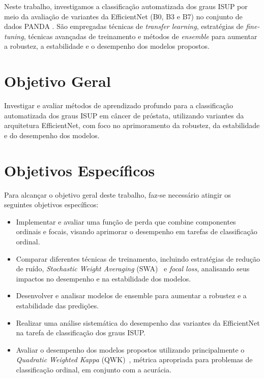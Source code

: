 Neste trabalho, investigamos a classificação automatizada dos graus ISUP por meio da avaliação de variantes da EfficientNet (B0, B3 e B7) no conjunto de dados PANDA \cite{ref-panda2020}. São empregadas técnicas de \textit{transfer learning}, estratégias de \textit{fine-tuning}, técnicas avançadas de treinamento e métodos de \textit{ensemble} para aumentar a robustez, a estabilidade e o desempenho dos modelos propostos.

\section{Objetivo Geral}
\label{sec:objetivo-geral}

Investigar e avaliar métodos de aprendizado profundo para a classificação automatizada dos graus ISUP em câncer de próstata, utilizando variantes da arquitetura EfficientNet, com foco no aprimoramento da robustez, da estabilidade e do desempenho dos modelos.

\section{Objetivos Específicos}
\label{sec:objetivos-especificos}

Para alcançar o objetivo geral deste trabalho, faz-se necessário atingir os seguintes objetivos específicos:

\begin{itemize}
    \item Implementar e avaliar uma função de perda que combine componentes ordinais e focais, visando aprimorar o desempenho em tarefas de classificação ordinal.
    \item  Comparar diferentes técnicas de treinamento, incluindo estratégias de redução de ruído, \textit{Stochastic Weight Averaging} (SWA)~\cite{ref-izmailov2018} e \textit{focal loss}, analisando seus impactos no desempenho e na estabilidade dos modelos.
    \item Desenvolver e analisar modelos de ensemble para aumentar a robustez e a estabilidade das predições.
    \item Realizar uma análise sistemática do desempenho das variantes da EfficientNet na tarefa de classificação dos graus ISUP.
    \item Avaliar o desempenho dos modelos propostos utilizando principalmente o \textit{Quadratic Weighted Kappa} (QWK)~\cite{ref-cohen1968}, métrica apropriada para problemas de classificação ordinal, em conjunto com a acurácia.
\end{itemize}

